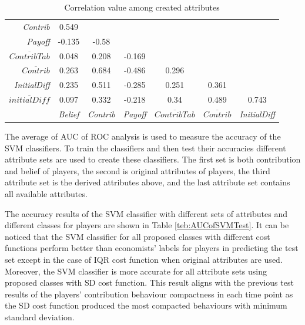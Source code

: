 \begin{table}[!h]
    \small
    \centering
    \caption {Correlation value among created attributes}
    \label{tab:createdAttributeCorelation}
    \begin{tabular}{r|cccccc}
        \textit{Contrib}   & 0.549  &        &  &        &      &       \\
        \textit{Payoff}                   & -0.135 & -0.58        &  &     &         &       \\
        $ \overline{ContribTab} $  & 0.048  & 0.208        & -0.169 &       &       &       \\
        $ \overline{Contrib} $     & 0.263  & 0.684        & -0.486 & 0.296      &    &       \\
        \textit{InitialDiff}              & 0.235  & 0.511      & -0.285 & 0.251   & 0.361  &       \\
        $ \overline{initialDiff} $ & 0.097  & 0.332      & -0.218 & 0.34   & 0.489   & 0.743    \\ \hline
        & \textit{Belief} & \textit{Contrib} & \textit{Payoff} & $ \overline{ContribTab} $ & $ \overline{Contrib} $ & \textit{InitialDiff} \\ 
    \end{tabular}
\end{table}


The average of AUC of ROC analysis is used to measure the accuracy of the SVM classifiers. To train the classifiers and then test their accuracies different attribute sets are used to create these classifiers. The first set is both contribution and belief of players, the second is original attributes of players, the third attribute set is the derived attributes above, and the last attribute set contains all available attributes.

The accuracy results of the SVM classifier with different sets of attributes and different classes for players are shown in Table  \ref{teb:AUCofSVMTest}. It can be noticed that the SVM classifier for all proposed classes with different cost functions perform better than economists' labels for players in predicting the test set except in the case of IQR cost function when original attributes are used. Moreover, the SVM classifier is more accurate for all attribute sets using proposed classes with SD cost function. This result aligns with the previous test results of the players' contribution behaviour compactness in each time point as the SD cost function produced the most compacted behaviours with minimum standard deviation.

